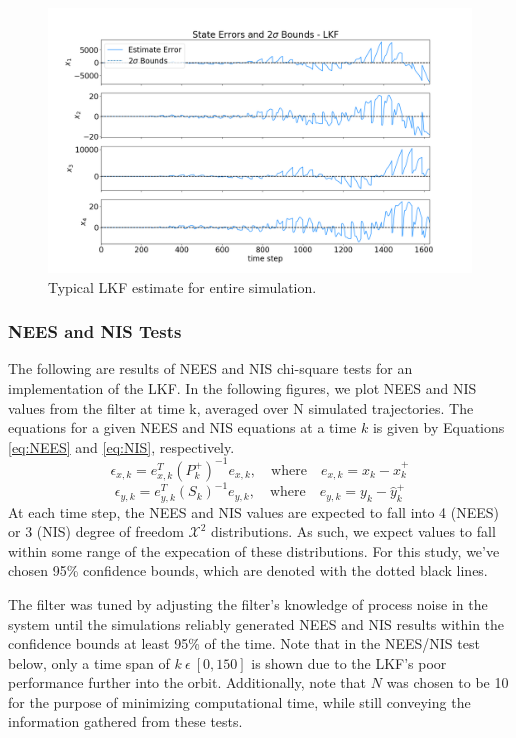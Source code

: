 \documentclass[11pt, a4paper]{article}
\begin{document}
\begin{figure}[H]
	\centering
	\includegraphics[width=\textwidth]{Figures/lkf_estimate_th.png}
	\caption{Typical LKF estimate for entire simulation.}
	\label{fig:lkf_est}
\end{figure}

\subsubsection{NEES and NIS Tests}
The following are results of NEES and NIS chi-square tests for an implementation of the LKF. 
In the following figures, we plot NEES and NIS values from the filter at time k, averaged over N simulated trajectories. 
The equations for a given NEES and NIS equations at a time $k$ is given by Equations \ref{eq:NEES} and \ref{eq:NIS}, respectively.
\begin{equation}
	\epsilon_{x,k} = e^T_{x,k} (P^+_k)^{-1} e_{x,k},
	\quad \text{where} \quad
	e_{x,k} = x_k - \hat{x}^+_k
	\label{eq:NEES}
\end{equation}
\begin{equation}
	\epsilon_{y,k} = e^T_{y,k} (S_k)^{-1} e_{y,k},
	\quad \text{where} \quad
	e_{y,k} = y_k - \hat{y}^+_k
	\label{eq:NIS}
\end{equation}
At each time step, the NEES and NIS values are expected to fall into 4 (NEES) or 3 (NIS) degree of freedom $\mathcal{X}^2$ distributions. 
As such, we expect values to fall within some range of the expecation of these distributions. 
For this study, we've chosen 95\% confidence bounds, which are denoted with the dotted black lines. 

The filter was tuned by adjusting the filter's knowledge of process noise in the system until the simulations reliably generated NEES and NIS results within the confidence bounds at least 95\% of the time. 
Note that in the NEES/NIS test below, only a time span of $k\ \epsilon\ [0, 150]$ is shown due to the LKF's poor performance further into the orbit. 
Additionally, note that $N$ was chosen to be 10 for the purpose of minimizing computational time, while still conveying the information gathered from these tests. 
\end{document}
